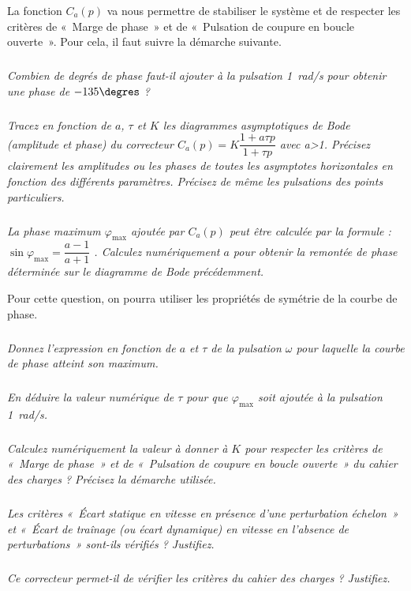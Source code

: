\documentclass[10pt,fleqn]{article} %
\begin{document}
\begin{multicols}{2}
	La fonction $C_a(p)$ va nous permettre de stabiliser le système et de respecter les critères de «~Marge de phase~» et de «~Pulsation de coupure en boucle ouverte~». Pour cela, il faut suivre la démarche suivante.

\subparagraph{}
\textit{Combien de degrés de phase faut-il ajouter à la pulsation \SI{1}{rad/s} pour obtenir une phase de $-135\degres$ ?}

\subparagraph{}
\textit{Tracez en fonction de $a$, $\tau$ et $K$ les diagrammes asymptotiques de Bode (amplitude et phase) du correcteur $C_a(p)=K\dfrac{1+a\tau p}{1+\tau p}$  avec a>1. Précisez clairement les amplitudes ou les phases de toutes les asymptotes horizontales en fonction des différents paramètres. Précisez de même les pulsations des points particuliers.}

\subparagraph{}
\textit{La phase maximum $\varphi_{\text{max}}$ ajoutée par $C_a(p)$ peut être calculée par la formule : $\sin \varphi_{\text{max}}=\dfrac{a-1}{a+1}$ . Calculez numériquement $a$ pour obtenir la remontée de phase déterminée sur le diagramme de Bode précédemment.}

Pour cette question, on pourra utiliser les propriétés de symétrie de la courbe de phase. 

\subparagraph{}
\textit{Donnez l’expression en fonction de $a$ et $\tau$ de la pulsation $\omega$ pour laquelle la courbe de phase atteint son maximum.}

\subparagraph{}
\textit{En déduire la valeur numérique de $\tau$ pour que $\varphi_{\text{max}}$ soit ajoutée à la pulsation \SI{1}{rad/s}.}

\subparagraph{}
\textit{Calculez numériquement la valeur à donner à $K$ pour respecter les critères de «~Marge de phase~» et de «~Pulsation de coupure en boucle ouverte~» du cahier des charges ? Précisez la démarche utilisée.}

\subparagraph{}
\textit{Les critères «~Écart statique en vitesse en présence d’une perturbation échelon~» et  «~Écart de traînage (ou écart dynamique) en vitesse en l’absence de perturbations~» sont-ils vérifiés ? Justifiez.}

\subparagraph{}
\textit{Ce correcteur permet-il de vérifier les critères du cahier des charges ? Justifiez.}

\end{multicols}
\end{document}
